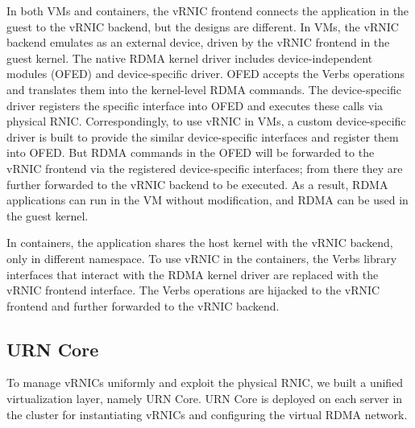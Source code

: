 In both VMs and containers, the vRNIC frontend connects the application in the guest to the vRNIC backend, but the designs are different. In VMs, the vRNIC backend emulates as an external device, driven by the vRNIC frontend in the guest kernel. The native RDMA kernel driver includes device-independent modules (OFED) and device-specific driver. OFED accepts the Verbs operations and translates them into the kernel-level RDMA commands. The device-specific driver registers the specific interface into OFED and executes these calls via physical RNIC. Correspondingly, to use vRNIC in VMs, a custom device-specific driver is built to provide the similar device-specific interfaces and register them into OFED. But RDMA commands in the OFED will be forwarded to the vRNIC frontend via the registered device-specific interfaces; from there
they are further forwarded to the vRNIC backend to be executed. As a result, RDMA applications can run in the VM without modification, and RDMA can be used in the guest kernel. 

In containers, the application shares the host kernel with the vRNIC backend, only in different namespace. To use vRNIC in the containers, the Verbs library interfaces that interact with the RDMA kernel driver are replaced with the vRNIC frontend interface. The Verbs operations are hijacked to the vRNIC frontend and further forwarded to the vRNIC backend.

\subsection{URN Core}

To manage vRNICs uniformly and exploit the physical RNIC, we built a unified virtualization layer, namely URN Core. URN Core is deployed on each server in the cluster for instantiating vRNICs and configuring the virtual RDMA network.

